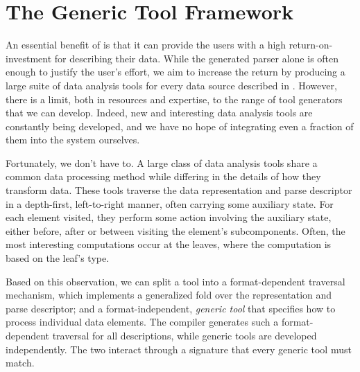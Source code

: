 \section{The Generic Tool Framework}
\label{sec:gen-tool}


An essential benefit of \padsml{} is that it can provide the users
with a high return-on-investment for describing their data. While the
generated parser alone is often enough to justify the user's effort,
we aim to increase the return by producing a large suite of data
analysis tools for every data source described in \padsml{}. However,
there is a limit, both in resources and expertise, to the range of
tool generators that we can develop. Indeed, new and interesting data
analysis tools are constantly being developed, and we have no hope of
integrating even a fraction of them into the \padsml{} system
ourselves.

Fortunately, we don't have to. A large class of data analysis tools
share a common data processing method while differing in the details
of how they transform data. These tools traverse the data
representation and parse descriptor in a depth-first, left-to-right
manner, often carrying some auxiliary state.  For each element
visited, they perform some action involving the auxiliary state,
either before, after or between visiting the element's subcomponents.
Often, the most interesting computations occur at the leaves, where
the computation is based on the leaf's type.  

Based on this observation, we can split a tool into a format-dependent
traversal mechanism, which implements a generalized fold over the
representation and parse descriptor; and a format-independent,
\emph{generic tool} that specifies how to process individual data
elements. The \padsml{} compiler generates such a format-dependent
traversal for all descriptions, while generic tools are developed
independently. The two interact through a signature that every generic
tool must match.

